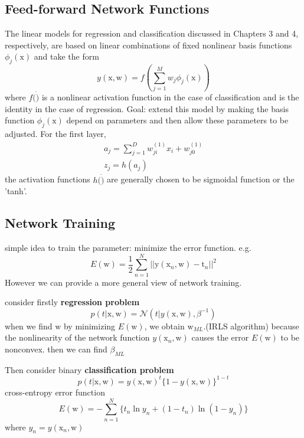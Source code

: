 \documentclass[a4paper]{book}
\begin{document}
\subsection{Feed-forward Network Functions}
The linear models for regression and classification discussed in Chapters 3 and 4, respectively, are based on linear combinations of fixed nonlinear basis functions $\phi_j(\mathrm x)$ and take the form
\begin{equation}\label{eq3.4.1}
  y(\mathrm x,\mathrm w) = f(\sum_{j=1}^Mw_j\phi_j(\mathrm x))
\end{equation}
where $f(\dot)$ is a nonlinear activation function in the case of classification and is the identity in the case of regression.\newline
Goal: extend this model by making the basis function $\phi_j(\mathrm x)$ depend on parameters and then allow these parameters to be adjusted.\newline
For the first layer,
\begin{gather}\label{eq3.4.2}
a_j=\sum_{j=1}^Dw_{ji}^{(1)}x_i+w_{j0}^{(1)} \\
z_j=h(a_j)
\end{gather}
the activation functions $h(\dot)$  are generally chosen to be sigmoidal function or the 'tanh'.
\subsection{Network Training}
simple idea to train the parameter: minimize the error function. e.g.
\begin{equation}\label{eq3.4.3}
  E(\mathrm w) = \frac12\sum_{n=1}^N||\mathrm y(\mathrm x_n,\mathrm w)-\mathrm t_n||^2
\end{equation}
However we can provide a more general view of network training.

consider firstly \textbf{regression problem}
$$p(t|\mathrm x,\mathrm w) = \mathcal N(t|y(\mathrm x,\mathrm w),\beta^{-1})$$
when we find $\mathrm w$ by minimizing $E(\mathrm w)$, we obtain $\mathrm w_{ML}$.(IRLS algorithm) because the nonlinearity of the network function $y(\mathrm x_n,\mathrm w)$ causes the error $E(\mathrm w)$ to be nonconvex.  then we can find $\beta_{ML}$

Then consider binary \textbf{classification problem}
$$p(t|\mathrm  x,\mathrm w) = y(\mathrm  x,\mathrm  w)^t\{1-y(\mathrm  x,\mathrm  w)\}^{1-t}$$
cross-entropy error function
\begin{equation}\label{eq3.4.4}
E(\mathrm w) = -\sum_{n=1}^N\{t_n\ln y_n+(1-t_n)\ln(1-y_n)\}
\end{equation}
where $y_n = y(\mathrm x_n,\mathrm w)$
\end{document}
